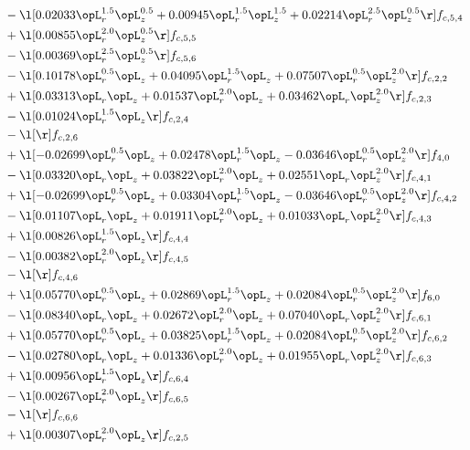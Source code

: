 \begin{alignat}{2}
& - \l[  0.02033 \opL_r^{1.5} \opL_z^{0.5} +  0.00945 \opL_r^{1.5} \opL_z^{1.5} +  0.02214 \opL_r^{2.5} \opL_z^{0.5}  \r] f_{c,5,4} \nonumber \\ 
& + \l[  0.00855 \opL_r^{2.0} \opL_z^{0.5}  \r] f_{c,5,5} \nonumber \\ 
& - \l[  0.00369 \opL_r^{2.5} \opL_z^{0.5}  \r] f_{c,5,6} \nonumber \\ 
& - \l[  0.10178 \opL_r^{0.5} \opL_z +  0.04095 \opL_r^{1.5} \opL_z +  0.07507 \opL_r^{0.5} \opL_z^{2.0}  \r] f_{c,2,2} \nonumber \\ 
& + \l[  0.03313 \opL_r \opL_z +  0.01537 \opL_r^{2.0} \opL_z +  0.03462 \opL_r \opL_z^{2.0}  \r] f_{c,2,3} \nonumber \\ 
& - \l[  0.01024 \opL_r^{1.5} \opL_z  \r] f_{c,2,4} \nonumber \\ 
& - \l[  \r] f_{c,2,6} \nonumber \\ 
& + \l[  -0.02699 \opL_r^{0.5} \opL_z +  0.02478 \opL_r^{1.5} \opL_z   -0.03646 \opL_r^{0.5} \opL_z^{2.0}  \r] f_{4,0} \nonumber \\ 
& - \l[  0.03320 \opL_r \opL_z +  0.03822 \opL_r^{2.0} \opL_z +  0.02551 \opL_r \opL_z^{2.0}  \r] f_{c,4,1} \nonumber \\ 
& + \l[  -0.02699 \opL_r^{0.5} \opL_z +  0.03304 \opL_r^{1.5} \opL_z   -0.03646 \opL_r^{0.5} \opL_z^{2.0}  \r] f_{c,4,2} \nonumber \\ 
& - \l[  0.01107 \opL_r \opL_z +  0.01911 \opL_r^{2.0} \opL_z +  0.01033 \opL_r \opL_z^{2.0}  \r] f_{c,4,3} \nonumber \\ 
& + \l[  0.00826 \opL_r^{1.5} \opL_z  \r] f_{c,4,4} \nonumber \\ 
& - \l[  0.00382 \opL_r^{2.0} \opL_z  \r] f_{c,4,5} \nonumber \\ 
& - \l[  \r] f_{c,4,6} \nonumber \\ 
& + \l[  0.05770 \opL_r^{0.5} \opL_z +  0.02869 \opL_r^{1.5} \opL_z +  0.02084 \opL_r^{0.5} \opL_z^{2.0}  \r] f_{6,0} \nonumber \\ 
& - \l[  0.08340 \opL_r \opL_z +  0.02672 \opL_r^{2.0} \opL_z +  0.07040 \opL_r \opL_z^{2.0}  \r] f_{c,6,1} \nonumber \\ 
& + \l[  0.05770 \opL_r^{0.5} \opL_z +  0.03825 \opL_r^{1.5} \opL_z +  0.02084 \opL_r^{0.5} \opL_z^{2.0}  \r] f_{c,6,2} \nonumber \\ 
& - \l[  0.02780 \opL_r \opL_z +  0.01336 \opL_r^{2.0} \opL_z +  0.01955 \opL_r \opL_z^{2.0}  \r] f_{c,6,3} \nonumber \\ 
& + \l[  0.00956 \opL_r^{1.5} \opL_z  \r] f_{c,6,4} \nonumber \\ 
& - \l[  0.00267 \opL_r^{2.0} \opL_z  \r] f_{c,6,5} \nonumber \\ 
& - \l[  \r] f_{c,6,6} \nonumber \\ 
& + \l[  0.00307 \opL_r^{2.0} \opL_z  \r] f_{c,2,5} \nonumber \\ 
\end{alignat} 


